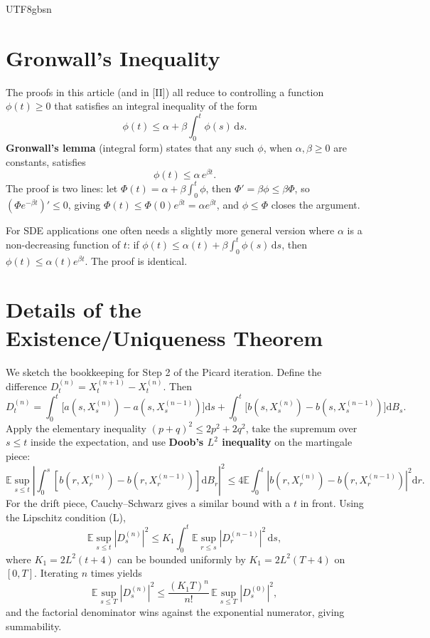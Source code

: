 \documentclass{article}
\begin{document}
\begin{CJK*}{UTF8}{gbsn}
\section{Gronwall's Inequality\label{app:gronwall}}

The proofs in this article (and in [II]) all reduce to controlling a function $\phi(t)\ge 0$ that satisfies an integral inequality of the form
\[
  \phi(t)\le \alpha+\beta\!\int_0^t\phi(s)\,\mathrm{d}s.
\]
\textbf{Gronwall's lemma} (integral form) states that any such $\phi$, when $\alpha,\beta\ge 0$ are constants, satisfies
\[
  \phi(t)\le \alpha\,e^{\beta t}.
\]
The proof is two lines: let $\Phi(t)=\alpha+\beta\!\int_0^t\phi$, then $\Phi'=\beta\phi\le\beta\Phi$, so $(\Phi e^{-\beta t})'\le 0$, giving $\Phi(t)\le\Phi(0)e^{\beta t}=\alpha e^{\beta t}$, and $\phi\le\Phi$ closes the argument.

For SDE applications one often needs a slightly more general version where $\alpha$ is a non-decreasing function of $t$: if $\phi(t)\le\alpha(t)+\beta\!\int_0^t\phi(s)\,\mathrm{d}s$, then $\phi(t)\le\alpha(t)e^{\beta t}$. The proof is identical.

\section{Details of the Existence/Uniqueness Theorem\label{app:exuniq}}

We sketch the bookkeeping for Step 2 of the Picard iteration. Define the difference $D^{(n)}_t=X^{(n+1)}_t-X^{(n)}_t$. Then
\[
  D^{(n)}_t=\int_0^t\!\bigl[a(s,X^{(n)}_s)-a(s,X^{(n-1)}_s)\bigr]\mathrm{d}s+\int_0^t\!\bigl[b(s,X^{(n)}_s)-b(s,X^{(n-1)}_s)\bigr]\mathrm{d}B_s.
\]
Apply the elementary inequality $(p+q)^2\le 2p^2+2q^2$, take the supremum over $s\le t$ inside the expectation, and use \textbf{Doob's $L^2$ inequality} on the martingale piece:
\[
  \mathbb{E}\sup_{s\le t}\!\left|\int_0^s\![b(r,X^{(n)}_r)-b(r,X^{(n-1)}_r)]\mathrm{d}B_r\right|^2\le 4\mathbb{E}\!\int_0^t\!|b(r,X^{(n)}_r)-b(r,X^{(n-1)}_r)|^2\mathrm{d}r.
\]
For the drift piece, Cauchy--Schwarz gives a similar bound with a $t$ in front. Using the Lipschitz condition (L),
\[
  \mathbb{E}\sup_{s\le t}|D^{(n)}_s|^2\le K_1\!\int_0^t\mathbb{E}\sup_{r\le s}|D^{(n-1)}_r|^2\,\mathrm{d}s,
\]
where $K_1=2L^2(t+4)$ can be bounded uniformly by $K_1=2L^2(T+4)$ on $[0,T]$. Iterating $n$ times yields
\[
  \mathbb{E}\sup_{s\le T}|D^{(n)}_s|^2\le \frac{(K_1 T)^n}{n!}\,\mathbb{E}\sup_{s\le T}|D^{(0)}_s|^2,
\]
and the factorial denominator wins against the exponential numerator, giving summability.


\end{CJK*}
\end{document}
